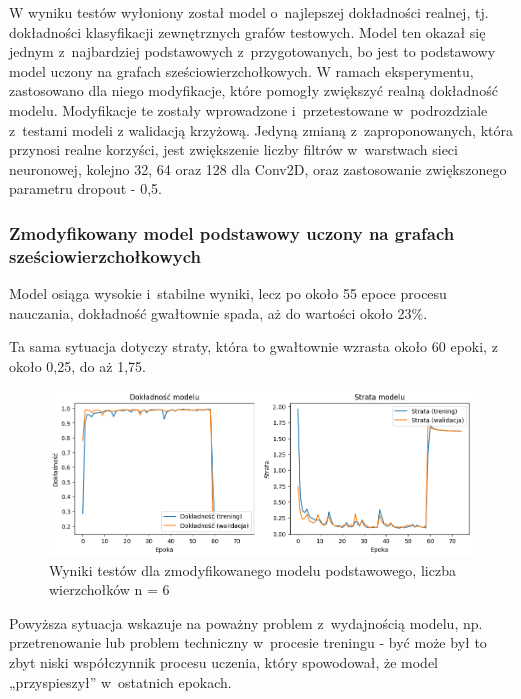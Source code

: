 W wyniku testów wyłoniony został model o~najlepszej dokładności realnej, tj.
dokładności klasyfikacji zewnętrznych grafów testowych.
Model ten okazał się jednym z~najbardziej podstawowych z~przygotowanych,
bo jest to podstawowy model uczony na grafach sześciowierzchołkowych.
W ramach eksperymentu, zastosowano dla niego modyfikacje,
które pomogły zwiększyć realną dokładność modelu.
Modyfikacje te zostały wprowadzone i~przetestowane w~podrozdziale z~testami modeli
z walidacją krzyżową.
Jedyną zmianą z~zaproponowanych, która przynosi realne korzyści,
jest zwiększenie liczby filtrów w~warstwach sieci neuronowej, kolejno 32, 64 oraz 128 dla Conv2D,
oraz zastosowanie zwiększonego parametru dropout - 0,5.

\subsubsection{Zmodyfikowany model podstawowy uczony na grafach sześciowierzchołkowych}

Model osiąga wysokie i~stabilne wyniki, lecz po około 55 epoce procesu nauczania,
dokładność gwałtownie spada, aż do wartości około 23\%.

Ta sama sytuacja dotyczy straty, która to gwałtownie wzrasta około 60 epoki,
z około 0,25, do aż 1,75.

\begin{figure}[ht]
	\centering
	\includegraphics[width=15.5cm]{resources/tests/images/v4/base6_1_img.png}
	\caption{Wyniki testów dla zmodyfikowanego modelu podstawowego, liczba wierzchołków n = 6}
	\label{Fig:tests-best-0a}
\end{figure}
\FloatBarrier

Powyższa sytuacja wskazuje na poważny problem z~wydajnością modelu,
np. przetrenowanie lub problem techniczny w~procesie treningu
- być może był to zbyt niski współczynnik procesu uczenia,
który spowodował, że model „przyspieszył” w~ostatnich epokach.



